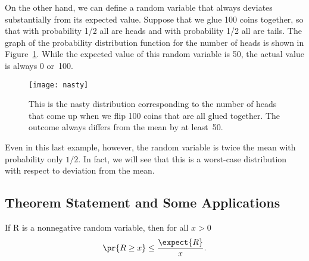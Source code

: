 \begin{editingnotes}
On the other hand, we can define a random variable that always
deviates substantially from its expected value.  Suppose that we glue
100 coins together, so that with probability 1/2 all are heads and
with probability 1/2 all are tails.  The graph of the probability
distribution function for the number of heads is shown in
Figure~\ref{fig:nasty}.  While the expected value of this random
variable is 50, the actual value is always 0 or~100.
\begin{figure}
  \centerline{\texttt{[image: nasty]}}
  \caption{This is the nasty distribution corresponding to the number
    of heads that come up when we flip 100 coins that are all glued
    together. The outcome always differs from the mean by at
    least~50.}
  \label{fig:nasty}
\end{figure}

Even in this last example, however, the random variable is twice the
mean with probability only $1/2$.  In fact, we will see that this is a
worst-case distribution with respect to deviation from the mean.

\subsection*{Theorem Statement and Some Applications}

\end{editingnotes}

\begin{theorem}\label{markovthm}
  If R is a nonnegative random variable, then for all $x > 0$
\begin{equation}\label{markovx}
    \pr{R \geq x} \leq \frac{\expect{R}}{x}.
\end{equation}
\end{theorem}

